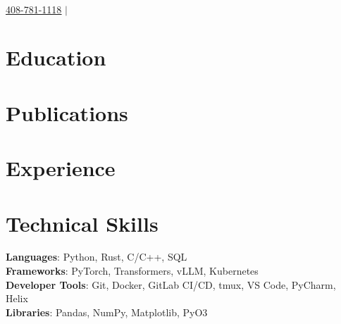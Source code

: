 \documentclass[letterpaper,11pt]{article}
\newcommand{\link}[2]{\href{#1}{\uline{#2}}}
\newenvironment{unlabeledlist}{\begin{itemize}[leftmargin=0.15in, label={}]}{\end{itemize}}
\newcommand{\phonenumber}{408-781-1118}
\newcommand{\contactSeparator}{$|$}
\begin{document}
\begin{center}
    \textbf{\Huge \scshape } \\ \vspace{1pt}
    \small \link{tel:+1-\phonenumber}{\phonenumber} \contactSeparator{} 
\end{center}

\section{Education}


\section{Publications}


\section{Experience}


\section{Technical Skills}
 \begin{unlabeledlist}
    \small{\item{
     \textbf{Languages}{: Python, Rust, C/C++, SQL} \\
     \textbf{Frameworks}{: PyTorch, Transformers, vLLM, Kubernetes} \\
     \textbf{Developer Tools}{: Git, Docker, GitLab CI/CD, tmux, VS Code, PyCharm, Helix} \\
     \textbf{Libraries}{: Pandas, NumPy, Matplotlib, PyO3}
    }}
 \end{unlabeledlist}
\end{document}
